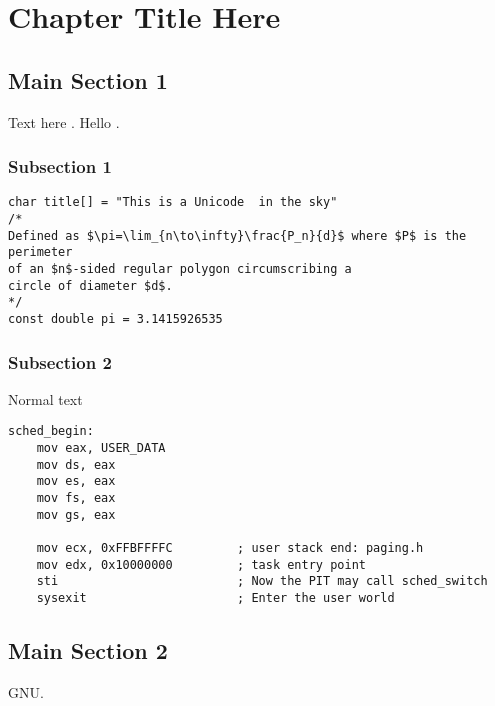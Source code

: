 \chapter{Chapter Title Here} %

\label{Chapter1} %


\section{Main Section 1}

Text here \parencite{POSIX}. Hello \parencite{ISOC99}.


\subsection{Subsection 1}

\begin{footnotesize}
\begin{verbatim}
char title[] = "This is a Unicode  in the sky"
/*
Defined as $\pi=\lim_{n\to\infty}\frac{P_n}{d}$ where $P$ is the perimeter
of an $n$-sided regular polygon circumscribing a
circle of diameter $d$.
*/
const double pi = 3.1415926535
\end{verbatim}
\end{footnotesize}


\subsection{Subsection 2}
Normal text

\begin{footnotesize}
\begin{verbatim}
sched_begin:
    mov eax, USER_DATA
    mov ds, eax
    mov es, eax
    mov fs, eax
    mov gs, eax
    
    mov ecx, 0xFFBFFFFC         ; user stack end: paging.h
    mov edx, 0x10000000         ; task entry point
    sti                         ; Now the PIT may call sched_switch
    sysexit                     ; Enter the user world
\end{verbatim}
\end{footnotesize}


\section{Main Section 2}

GNU.
